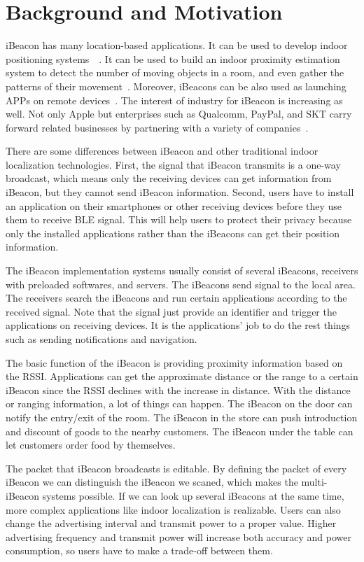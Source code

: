 \documentclass[12pt]{report}
\begin{document}
\section{Background and Motivation}
iBeacon has many location-based applications. It can be used to develop indoor positioning systems~\cite{mar}~\cite{gen15a}. It can be used to build an indoor proximity estimation system to detect the number of moving objects in a room, and even gather the patterns of their movement~\cite{cor}. Moreover, iBeacons can be also used as launching APPs on remote devices~\cite{bas}. The interest of industry for iBeacon is increasing as well. Not only Apple but enterprises such as Qualcomm, PayPal, and SKT carry forward related businesses by partnering with a variety of companies~\cite{kim}.

There are some differences between iBeacon and other traditional indoor localization technologies. First, the signal that iBeacon transmits is a one-way broadcast, which means only the receiving devices can get information from iBeacon, but they cannot send iBeacon information. Second, users have to install an application on their smartphones or other receiving devices before they use them to receive BLE signal. This will help users to protect their privacy because only the installed applications rather than the iBeacons can get their position information.

The iBeacon implementation systems usually consist of several iBeacons, receivers with preloaded softwares, and servers. The iBeacons send signal to the local area. The receivers search the iBeacons and run certain applications according to the received signal. Note that the signal just provide an identifier and trigger the applications on receiving devices. It is the applications' job to do the rest things such as sending notifications and navigation.

The basic function of the iBeacon is providing proximity information based on the RSSI. Applications can get the approximate distance or the range to a certain iBeacon since the RSSI declines with the increase in distance. With the distance or ranging information, a lot of things can happen. The iBeacon on the door can notify the entry/exit of the room. The iBeacon in the store can push introduction and discount of goods to the nearby customers. The iBeacon under the table can let customers order food by themselves. 

The packet that iBeacon broadcasts is editable. By defining the packet of every iBeacon we can distinguish the iBeacon we scaned, which makes the multi-iBeacon systems possible. If we can look up several iBeacons at the same time, more complex applications like indoor localization is realizable. Users can also change the advertising interval and transmit power to a proper value. Higher advertising frequency and transmit power will increase both accuracy and power consumption, so users have to make a trade-off between them.
\end{document}
